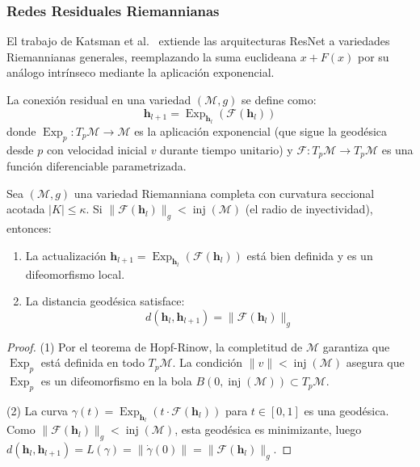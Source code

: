 \subsubsection{Redes Residuales Riemannianas}

El trabajo de Katsman et al.~\citep{katsman2023riemannian} extiende las arquitecturas ResNet a variedades Riemannianas generales, reemplazando la suma euclideana $x + F(x)$ por su análogo intrínseco mediante la aplicación exponencial.

\begin{definition}\label{def:residual_riemanniano}
La conexión residual en una variedad $(\mathcal{M}, g)$ se define como:
\begin{equation}
\mathbf{h}_{l+1} = \operatorname{Exp}_{\mathbf{h}_l}(\mathcal{F}(\mathbf{h}_l))
\end{equation}
donde $\operatorname{Exp}_p: T_p\mathcal{M} \to \mathcal{M}$ es la aplicación exponencial (que sigue la geodésica desde $p$ con velocidad inicial $v$ durante tiempo unitario) y $\mathcal{F}: T_p\mathcal{M} \to T_p\mathcal{M}$ es una función diferenciable parametrizada.
\end{definition}

\begin{proposition}\label{prop:estabilidad_residual_riemanniano}
Sea $(\mathcal{M}, g)$ una variedad Riemanniana completa con curvatura seccional acotada $|K| \leq \kappa$. Si $\|\mathcal{F}(\mathbf{h}_l)\|_g < \operatorname{inj}(\mathcal{M})$ (el radio de inyectividad), entonces:
\begin{enumerate}
    \item La actualización $\mathbf{h}_{l+1} = \operatorname{Exp}_{\mathbf{h}_l}(\mathcal{F}(\mathbf{h}_l))$ está bien definida y es un difeomorfismo local.
    \item La distancia geodésica satisface:
    \begin{equation}
    d(\mathbf{h}_l, \mathbf{h}_{l+1}) = \|\mathcal{F}(\mathbf{h}_l)\|_g
    \end{equation}
\end{enumerate}
\end{proposition}

\begin{proof}
(1) Por el teorema de Hopf-Rinow, la completitud de $\mathcal{M}$ garantiza que $\operatorname{Exp}_p$ está definida en todo $T_p\mathcal{M}$. La condición $\|v\| < \operatorname{inj}(\mathcal{M})$ asegura que $\operatorname{Exp}_p$ es un difeomorfismo en la bola $B(0, \operatorname{inj}(\mathcal{M})) \subset T_p\mathcal{M}$.

(2) La curva $\gamma(t) = \operatorname{Exp}_{\mathbf{h}_l}(t \cdot \mathcal{F}(\mathbf{h}_l))$ para $t \in [0,1]$ es una geodésica. Como $\|\mathcal{F}(\mathbf{h}_l)\|_g < \operatorname{inj}(\mathcal{M})$, esta geodésica es minimizante, luego $d(\mathbf{h}_l, \mathbf{h}_{l+1}) = L(\gamma) = \|\dot{\gamma}(0)\| = \|\mathcal{F}(\mathbf{h}_l)\|_g$.
\end{proof}

